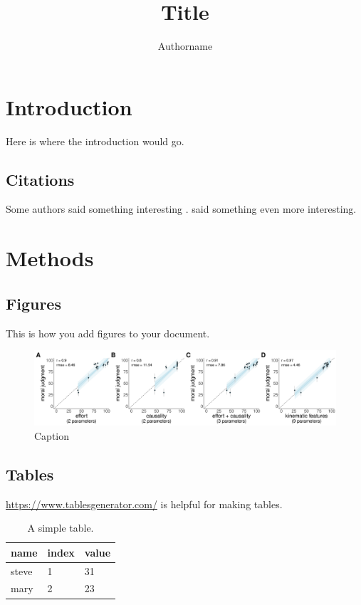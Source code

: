 \documentclass[doc,natbib,floatsintext]{apa7}
\title{Title}
\author{Authorname}
\affiliation{Affiliation}
\begin{document}
\maketitle

\section{Introduction} 

Here is where the introduction would go. 

\subsection{Citations}

Some authors said something interesting \citep{gerstenberg2021csm}. \cite{gelman1986categories} said something even more interesting.

\section{Methods}

\subsection{Figures}

This is how you add figures to your document. 

\begin{figure}[t]
    \centering
    \includegraphics{example_figure}
    \caption{Caption}
    \label{fig:example_figure}
\end{figure}

\subsection{Tables} 

\url{https://www.tablesgenerator.com/} is helpful for making tables. 

\begin{table}[b]
\caption{A simple table.}
\label{tab:simple_table}
\begin{tabular}{lll}
\toprule
name  & index & value \\
\midrule
steve & 1     & 31    \\
mary  & 2     & 23   \\
\bottomrule
\end{tabular}
\end{table}

\clearpage 


\end{document}
